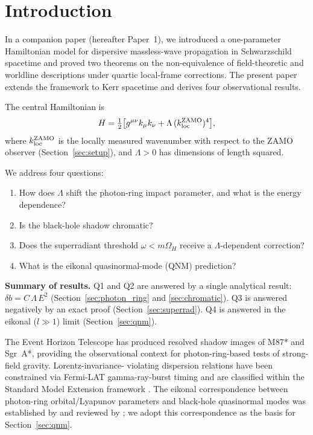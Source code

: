 \documentclass[12pt,a4paper]{article}
\newcommand{\OmH}{\Omega_H}
\begin{document}
\newpage\tableofcontents\newpage

\section{Introduction}

In a companion paper \citep{Kretski2026a} (hereafter Paper~1), we
introduced a one-parameter Hamiltonian model for dispersive massless-wave
propagation in Schwarzschild spacetime and proved two theorems on the
non-equivalence of field-theoretic and worldline descriptions under
quartic local-frame corrections.
The present paper extends the framework to Kerr spacetime and derives
four observational results.

The central Hamiltonian is
\begin{equation}\label{eq:H}
  H = \tfrac{1}{2}\bigl[g^{\mu\nu}k_\mu k_\nu
    + \Lambda\,(k_{\rm loc}^{\rm ZAMO})^4\bigr],
\end{equation}
where $k_{\rm loc}^{\rm ZAMO}$ is the locally measured wavenumber
with respect to the ZAMO observer (Section~\ref{sec:setup}),
and $\Lambda>0$ has dimensions of length squared.

We address four questions:
\begin{enumerate}
  \item[(Q1)] How does $\Lambda$ shift the photon-ring impact parameter,
    and what is the energy dependence?
  \item[(Q2)] Is the black-hole shadow chromatic?
  \item[(Q3)] Does the superradiant threshold $\omega<m\OmH$ receive
    a $\Lambda$-dependent correction?
  \item[(Q4)] What is the eikonal quasinormal-mode (QNM) prediction?
\end{enumerate}

\textbf{Summary of results.}
Q1 and Q2 are answered by a single analytical result:
$\delta b = C\,\Lambda\,E^2$ (Section~\ref{sec:photon_ring}
and \ref{sec:chromatic}).
Q3 is answered negatively by an exact proof (Section~\ref{sec:superrad}).
Q4 is answered in the eikonal ($l\gg 1$) limit
(Section~\ref{sec:qnm}).

The Event Horizon Telescope has produced resolved shadow images of
M87* \citep{EHT2019} and Sgr~A*, providing the observational context
for photon-ring-based tests of strong-field gravity. Lorentz-invariance-
violating dispersion relations have been constrained via Fermi-LAT
gamma-ray-burst timing \citep{Abdo2009} and are classified within the
Standard Model Extension framework \citep{Liberati2013}. The eikonal
correspondence between photon-ring orbital/Lyapunov parameters and
black-hole quasinormal modes was established by
\citet{Cardoso2009} and reviewed by \citet{Berti2009}; we adopt this
correspondence as the basis for Section~\ref{sec:qnm}.
\end{document}
